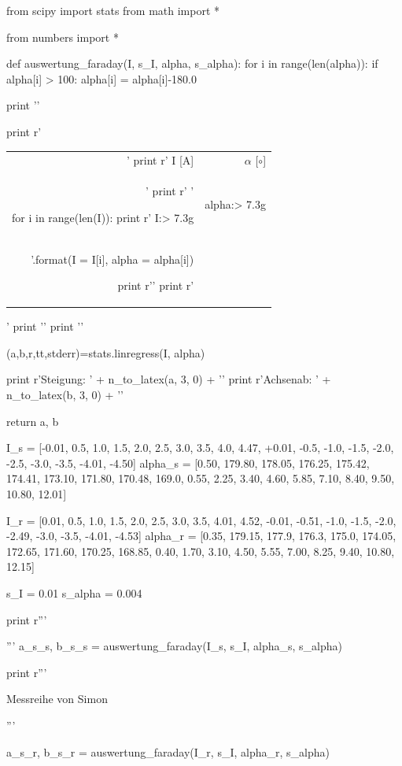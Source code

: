 \begin{python}
from scipy import stats
from math import *

from numbers import *

def auswertung_faraday(I, s_I, alpha, s_alpha):
  for i in range(len(alpha)):
    if alpha[i] > 100:
      alpha[i] = alpha[i]-180.0

  print '\n'

  print r'\begin{tabular}{rr} \toprule'
  print r' I [A] & $\alpha$ [$\circ$] \\'
  print r' \midrule '

  for i in range(len(I)):
    print r' {I:> 7.3g}  &  {alpha:> 7.3g} \\ '.format(I = I[i], alpha = alpha[i])

  print r'\bottomrule '
  print r'\end{tabular}'
  print '\n'
  print '\n'

  (a,b,r,tt,stderr)=stats.linregress(I, alpha)

  print r'Steigung: ' + n_to_latex(a, 3, 0) + '\n'
  print r'Achsenab: ' + n_to_latex(b, 3, 0) + '\n'

  return a, b


I_s = [-0.01, 0.5, 1.0, 1.5, 2.0, 2.5, 3.0, 3.5, 4.0, 4.47, +0.01, -0.5, -1.0, -1.5, -2.0, -2.5, -3.0, -3.5, -4.01, -4.50]
alpha_s = [0.50, 179.80, 178.05, 176.25, 175.42, 174.41, 173.10, 171.80, 170.48, 169.0, 0.55, 2.25, 3.40, 4.60, 5.85, 7.10, 8.40, 9.50, 10.80, 12.01]

I_r = [0.01, 0.5, 1.0, 1.5, 2.0, 2.5, 3.0, 3.5, 4.01, 4.52, -0.01, -0.51, -1.0, -1.5, -2.0, -2.49, -3.0, -3.5, -4.01, -4.53]
alpha_r = [0.35, 179.15, 177.9, 176.3, 175.0, 174.05, 172.65, 171.60, 170.25, 168.85, 0.40, 1.70, 3.10, 4.50, 5.55, 7.00, 8.25, 9.40, 10.80, 12.15]

s_I = 0.01
s_alpha = 0.004


print r'''\begin{table}[H]
\begin{minipage}[b]{0.5\linewidth}
\centering
         '''
a_s_s, b_s_s = auswertung_faraday(I_s, s_I, alpha_s, s_alpha)

print r'''  \caption{Messreihe von Simon}
	  \end{minipage}
	  \begin{minipage}[b]{0.5\linewidth}
	    \centering
           '''

a_s_r, b_s_r = auswertung_faraday(I_r, s_I, alpha_r, s_alpha)


\end{minipage}
\end{table}
\end{python}
